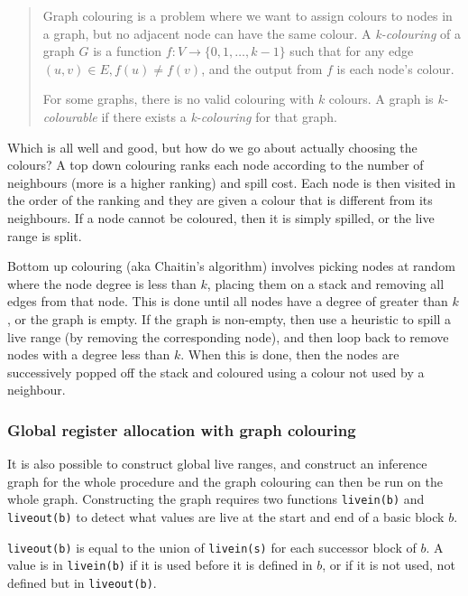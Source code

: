 \begin{quote}
 Graph colouring is a problem where we want to assign colours to nodes
 in a graph, but no adjacent node can have the same
 colour. A \textit{k-colouring} of a graph $G$ is a function $f :
 V \rightarrow \{ 0, 1, \dots, k - 1 \}$ such that for any edge $(u,
 v) \in E, f(u) \neq f(v)$, and the output from $f$ is each node's
 colour.

 For some graphs, there is no valid colouring with $k$ colours. A
 graph is \textit{k-colourable} if there exists a \textit{k-colouring}
 for that graph.
\end{quote}

Which is all well and good, but how do we go about actually choosing
the colours? A top down colouring ranks each node according to the
number of neighbours (more is a higher ranking) and spill cost. Each
node is then visited in the order of the ranking and they are given a
colour that is different from its neighbours. If a node cannot be
coloured, then it is simply spilled, or the live range is split.

Bottom up colouring (aka Chaitin's algorithm) involves picking nodes
at random where the node degree is less than $k$, placing them on a
stack and removing all edges from that node. This is done until all
nodes have a degree of greater than $k$, or the graph is empty. If the
graph is non-empty, then use a heuristic to spill a live range (by
removing the corresponding node), and then loop back to remove nodes
with a degree less than $k$. When this is done, then the nodes are
successively popped off the stack and coloured using a colour not used
by a neighbour.

\subsubsection{Global register allocation with graph colouring}

It is also possible to construct global live ranges, and construct an
inference graph for the whole procedure and the graph colouring can then
be run on the whole graph. Constructing the graph requires two
functions \texttt{livein(b)} and \texttt{liveout(b)} to detect what
values are live at the start and end of a basic block $b$.

\texttt{liveout(b)} is equal to the union of \texttt{livein(s)} for
each successor block of $b$. A value is in \texttt{livein(b)} if it is
used before it is defined in $b$, or if it is not used, not defined
but in \texttt{liveout(b)}.

